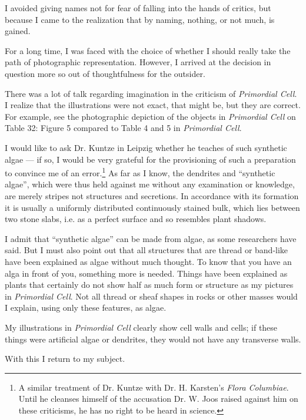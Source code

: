 \documentclass[a4paper, 12pt, oneside]{article}
\begin{document}
I avoided giving names not for fear of falling into the hands of critics, but because I came to the realization that by naming, nothing, or not much, is gained.

For a long time, I was faced with the choice of whether I should really take the path of photographic representation. However, I arrived at the decision in question more so out of thoughtfulness for the outsider.

There was a lot of talk regarding imagination in the criticism of \emph{Primordial Cell}. I realize that the illustrations were not exact, that might be, but they are correct. For example, see the photographic depiction of the objects in \emph{Primordial Cell} on Table 32: Figure 5 compared to Table 4 and 5 in \emph{Primordial Cell}.

I would like to ask Dr. Kuntze in Leipzig whether he teaches of such synthetic algae — if so, I would be very grateful for the provisioning of such a preparation to convince me of an error.\footnote{A similar treatment of Dr. Kuntze with Dr. H. Karsten's \emph{Flora Columbiae}. Until he cleanses himself of the accusation Dr. W. Joos raised against him on these criticisms, he has no right to be heard in science.} As far as I know, the dendrites and ``synthetic algae'', which were thus held against me without any examination or knowledge, are merely stripes not structures and secretions. In accordance with its formation it is usually a uniformly distributed continuously stained bulk, which lies between two stone slabs, i.e. as a perfect surface and so resembles plant shadows.

I admit that ``synthetic algae'' can be made from algae, as some researchers have said. But I must also point out that all structures that are thread or band-like have been explained as algae without much thought. To know that you have an alga in front of you, something more is needed. Things have been explained as plants that certainly do not show half as much form or structure as my pictures in \emph{Primordial Cell}. Not all thread or sheaf shapes in rocks or other masses would I explain, using only these features, as algae.

My illustrations in \emph{Primordial Cell} clearly show cell walls and cells; if these things were artificial algae or dendrites, they would not have any transverse walls.

With this I return to my subject.
\end{document}
